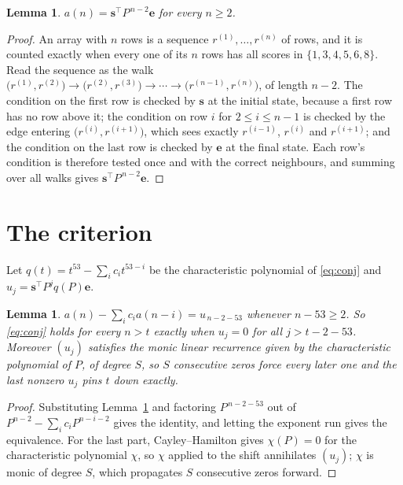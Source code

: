 \documentclass[11pt,a4paper]{article}
\theoremstyle{plain}
\newtheorem{lemma}[theorem]{Lemma}
\theoremstyle{definition}
\begin{document}
\begin{lemma}\label{lem:walk}
$a(n)=\mathbf{s}^{\!\top}P^{\,n-2}\mathbf{e}$ for every $n\ge2$.
\end{lemma}

\begin{proof}
An array with $n$ rows is a sequence $r^{(1)},\dots,r^{(n)}$ of rows, and it is counted
exactly when every one of its $n$ rows has all scores in $\{1,3,4,5,6,8\}$. Read the sequence as the
walk $\bigl(r^{(1)},r^{(2)}\bigr)\to\bigl(r^{(2)},r^{(3)}\bigr)\to\cdots\to
\bigl(r^{(n-1)},r^{(n)}\bigr)$, of length $n-2$. The condition on the first row is
checked by $\mathbf{s}$ at the initial state, because a first row has no row above it; the
condition on row $i$ for $2\le i\le n-1$ is checked by the edge entering
$\bigl(r^{(i)},r^{(i+1)}\bigr)$, which sees exactly $r^{(i-1)}$, $r^{(i)}$ and
$r^{(i+1)}$; and the condition on the last row is checked by $\mathbf{e}$ at the final
state. Each row's condition is therefore tested once and with the correct neighbours, and
summing over all walks gives $\mathbf{s}^{\!\top}P^{\,n-2}\mathbf{e}$.
\end{proof}

\section{The criterion}

Let $q(t)=t^{53}-\sum_i c_i t^{53-i}$ be the characteristic polynomial of
\eqref{eq:conj} and $u_j=\mathbf{s}^{\!\top}P^{j}q(P)\mathbf{e}$.

\begin{lemma}\label{lem:crit}
$a(n)-\sum_i c_i a(n-i)=u_{\,n-2-53}$ whenever $n-53\ge2$. So \eqref{eq:conj}
holds for every $n>t$ exactly when $u_j=0$ for all $j>t-2-53$. Moreover $(u_j)$
satisfies the monic linear recurrence given by the characteristic polynomial of $P$, of
degree $S$, so $S$ consecutive zeros force every later one and the last nonzero $u_j$ pins
$t$ down exactly.
\end{lemma}

\begin{proof}
Substituting Lemma~\ref{lem:walk} and factoring $P^{\,n-2-53}$ out of
$P^{n-2}-\sum_i c_i P^{n-i-2}$ gives the identity, and letting the exponent run gives the
equivalence. For the last part, Cayley--Hamilton gives $\chi(P)=0$ for the characteristic
polynomial $\chi$, so $\chi$ applied to the shift annihilates $(u_j)$; $\chi$ is monic of
degree $S$, which propagates $S$ consecutive zeros forward.
\end{proof}
\end{document}
